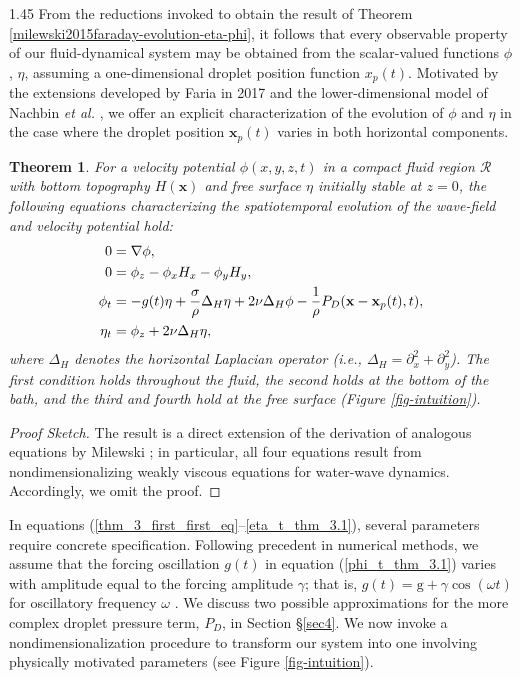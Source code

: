 \documentclass[12pt,titlepage]{article}
\newtheorem{theorem}{Theorem}[section] %
\theoremstyle{definition}
\theoremstyle{remark}
\newcommand{\M}[1]{\mathbf{#1}}
\begin{document}
\begin{spacing}{1.45}
From the reductions invoked to obtain the result of Theorem \ref{milewski2015faraday-evolution-eta-phi}, it follows that every observable property of our fluid-dynamical system may be obtained from the scalar-valued functions $\phi$, $\eta$, assuming a one-dimensional droplet position function $x_p(t)$. Motivated by the extensions developed by Faria in 2017 \cite{faria2017model} and the lower-dimensional model of Nachbin \textit{et al.} \cite{nachbin2017tunneling}, we offer an explicit characterization of the evolution of $\phi$ and $\eta$ in the case where the droplet position $\M{x}_p(t)$ varies in both horizontal components.
\begin{theorem}
For a velocity potential $\phi(x, y, z, t)$ in a compact fluid region $\mathcal{R}$ with bottom topography $H(\M{x})$ and free surface $\eta$ initially stable at $z = 0$, the following equations characterizing the spatiotemporal evolution of the wave-field and velocity potential hold:
    \begin{align}
\centering
\label{thm_3_first_first_eq}
    0 &= \nabla \phi, \\
\label{bottom_thm_3.1}
    0 &= \phi_z - \phi_x H_x - \phi_y H_y,\\
\label{phi_t_thm_3.1}
    \phi_t &= -g(t) \eta + \frac{\sigma}{\rho} \Delta_{H} \eta  + 2 \nu \Delta_{H} \phi - \frac{1}{\rho} P_D(\M{x} - \M{x}_p(t), t) ,\\
\label{eta_t_thm_3.1}
    \eta_t &= \phi_z + 2 \nu \Delta_{H} \eta,
\end{align}
where $\Delta_{H}$ denotes the horizontal Laplacian operator (i.e., $\Delta_H = \partial_x^2 + \partial_y^2$). The first condition holds throughout the fluid, the second holds at the bottom of the bath, and the third and fourth hold at the free surface (Figure \ref{fig-intuition}).
\end{theorem}
\begin{proof}[Proof Sketch]
    The result is a direct extension of the derivation of analogous equations by Milewski \cite{milewski2015faraday}; in particular, all four equations result from nondimensionalizing weakly viscous equations for water-wave dynamics. Accordingly, we omit the proof.
\end{proof}

In equations (\ref{thm_3_first_first_eq}–\ref{eta_t_thm_3.1}), several parameters require concrete specification. Following precedent in numerical methods, we assume that the forcing oscillation $g(t)$ in equation (\ref{phi_t_thm_3.1}) varies with amplitude equal to the forcing amplitude $\gamma$; that is, $g(t) = \mathrm{g} + \gamma \cos(\omega t)$ for oscillatory frequency $\omega$ \cite{oza2013trajectory, eddi2009unpredictable}. We discuss two possible approximations for the more complex droplet pressure term, $P_D$, in Section §\ref{sec4}. We now invoke a nondimensionalization procedure to transform our system into one involving physically motivated parameters (see Figure \ref{fig-intuition}). 


\end{spacing}
\end{document}
